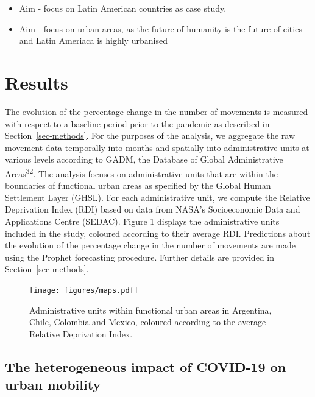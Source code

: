 \documentclass[
  11pt,
]{article}
\providecommand{\tightlist}{%
  \setlength{\itemsep}{0pt}\setlength{\parskip}{0pt}}\usepackage{longtable,booktabs,array}
\begin{document}
\begin{itemize}
\tightlist
\item
  Aim - focus on Latin American countries as case study.
\item
  Aim - focus on urban areas, as the future of humanity is the future of
  cities and Latin Ameriaca is highly urbanised
\end{itemize}

\hypertarget{sec-results}{%
\section{Results}\label{sec-results}}

The evolution of the percentage change in the number of movements is
measured with respect to a baseline period prior to the pandemic as
described in Section~\ref{sec-methods}. For the purposes of the
analysis, we aggregate the raw movement data temporally into months and
spatially into administrative units at various levels according to GADM,
the Database of Global Administrative Areas\textsuperscript{32}. The
analysis focuses on administrative units that are within the boundaries
of functional urban areas as specified by the Global Human Settlement
Layer (GHSL). For each administrative unit, we compute the Relative
Deprivation Index (RDI) based on data from NASA's Socioeconomic Data and
Applications Centre (SEDAC). Figure 1 displays the administrative units
included in the study, coloured according to their average RDI.
Predictions about the evolution of the percentage change in the number
of movements are made using the Prophet forecasting procedure. Further
details are provided in Section~\ref{sec-methods}.

\begin{figure}

{\centering \texttt{[image: figures/maps.pdf]}

}

\caption{Administrative units within functional urban areas in
Argentina, Chile, Colombia and Mexico, coloured according to the average
Relative Deprivation Index.}

\end{figure}

\hypertarget{the-heterogeneous-impact-of-covid-19-on-urban-mobility}{%
\subsection{The heterogeneous impact of COVID-19 on urban
mobility}\label{the-heterogeneous-impact-of-covid-19-on-urban-mobility}}
\end{document}
